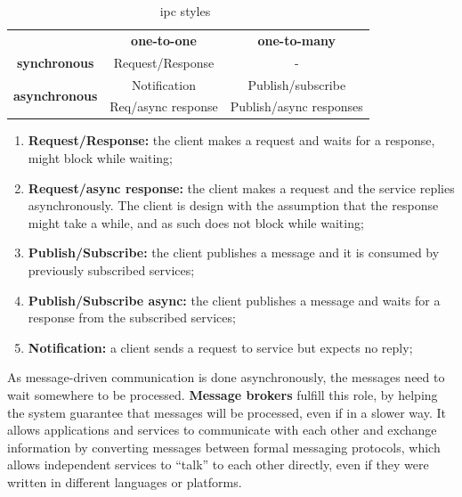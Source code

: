 \begin{table}[t]
\caption[Inter-process communication styles]{\acrshort{ipc} styles~\cite{nginx-microservices}}
    \label{tab:nginx-microservices}
    \centering
    \begin{tabular}{c c c} 
    \toprule
    \multicolumn{1}{c}{}         & \textbf{one-to-one}& \textbf{one-to-many}     \\ 
    \cline{2-3}
    \textbf{synchronous}                   & Request/Response   & -                 \\ 
    \hline
    \multirow{2}{*}{\textbf{asynchronous}} & Notification       & Publish/subscribe   \\ 
    \cline{2-3}
                                  & Req/async response & Publish/async responses  \\
    \bottomrule
    \end{tabular}
    
\end{table}
\begin{enumerate}
    \item \textbf{Request/Response:} the client makes a request and waits for a response, might block while waiting;
    \item \textbf{Request/async response:} the client makes a request and the service replies asynchronously. The client is design with the assumption that the response might take a while, and as such does not block while waiting;
    \item \textbf{Publish/Subscribe:} the client publishes a message and it is consumed by previously subscribed services;
    \item \textbf{Publish/Subscribe async:} the client publishes a message and waits for a response from the subscribed services;
    \item \textbf{Notification:} a client sends a request to service but expects no reply;
\end{enumerate}

As message-driven communication is done asynchronously, the messages need to wait somewhere to be processed. \textbf{Message brokers} fulfill this role, by helping the system guarantee that messages will be processed, even if in a slower way. It allows applications and services to communicate with each other and exchange information by converting messages between formal messaging protocols, which allows independent services to ``talk'' to each other directly, even if they were written in different languages or platforms.




